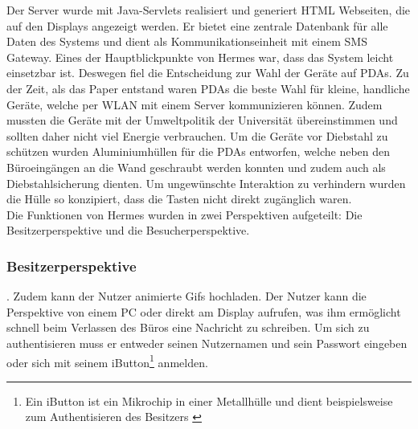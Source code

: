 Der Server wurde mit Java-Servlets realisiert und generiert HTML Webseiten, die auf den Displays angezeigt werden. Er bietet eine zentrale Datenbank für alle Daten des Systems und dient als Kommunikationseinheit mit einem SMS Gateway.
Eines der Hauptblickpunkte von Hermes war, dass das System leicht einsetzbar ist. Deswegen fiel die Entscheidung zur Wahl der Geräte auf PDAs. Zu der Zeit, als das Paper entstand waren PDAs die beste Wahl für kleine, handliche Geräte, welche per WLAN mit einem Server kommunizieren können. Zudem mussten die Geräte mit der Umweltpolitik der Universität übereinstimmen und sollten daher nicht viel Energie verbrauchen.
Um die Geräte vor Diebstahl zu schützen wurden Aluminiumhüllen für die PDAs entworfen, welche neben den Büroeingängen an die Wand geschraubt werden konnten und zudem auch als Diebstahlsicherung dienten. Um ungewünschte Interaktion zu verhindern wurden die Hülle so konzipiert, dass die Tasten nicht direkt zugänglich waren.\\

Die Funktionen von Hermes wurden in zwei Perspektiven aufgeteilt: Die Besitzerperspektive und die Besucherperspektive.
\subsubsection{Besitzerperspektive}
\cite{cheverest:2003:paper}. Zudem kann der Nutzer animierte Gifs hochladen.
Der Nutzer kann die Perspektive von einem PC oder direkt am Display aufrufen, was ihm ermöglicht schnell beim Verlassen des Büros eine Nachricht zu schreiben. Um sich zu authentisieren muss er entweder seinen Nutzernamen und sein Passwort eingeben oder sich mit seinem iButton\footnote{Ein iButton ist ein Mikrochip in einer Metallhülle und dient beispielsweise zum Authentisieren des Besitzers \cite{iButton:website}} anmelden.
